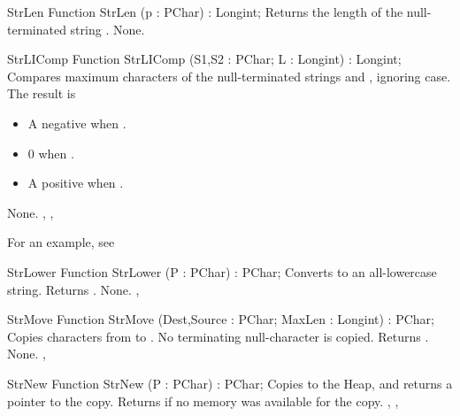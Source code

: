
\begin{function}{StrLen}
\Declaration
Function StrLen (p : PChar) : Longint;
\Description
Returns the length of the null-terminated string .
\Errors
None.
\SeeAlso
{}
\end{function}


\begin{function}{StrLIComp}
\Declaration
Function StrLIComp (S1,S2 : PChar; L : Longint) : Longint;
\Description
Compares maximum  characters of the null-terminated strings  
and , ignoring case.
The result is 
\begin{itemize}
\item A negative  when .
\item 0 when .
\item A positive  when .
\end{itemize}
\Errors
None.
\SeeAlso
{}, , 
\end{function}

For an example, see 

\begin{function}{StrLower}
\Declaration
Function StrLower (P : PChar) : PChar;
\Description
Converts  to an all-lowercase string. Returns .
\Errors
None.
\SeeAlso
{}, 
\end{function}


\begin{function}{StrMove}
\Declaration
Function StrMove (Dest,Source : PChar; MaxLen : Longint) : PChar;
\Description
Copies  characters from  to . No
terminating null-character is copied.
Returns .
\Errors
None.
\SeeAlso
{}, 
\end{function}


\begin{function}{StrNew}
\Declaration
Function StrNew (P : PChar) : PChar;
\Description
Copies  to the Heap, and returns a pointer to the copy.
\Errors
Returns  if no memory was available for the copy.
\SeeAlso
{}, , 
\end{function}

